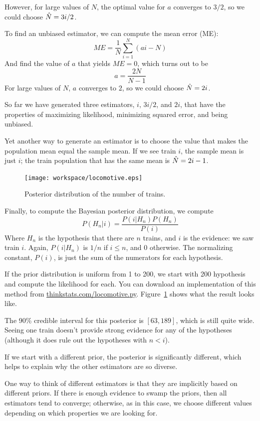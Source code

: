 \documentclass[12pt]{book}
\begin{document}
However, for large values of $N$, the optimal value for $a$ converges
to $3/2$, so we could choose $\hat{N} = 3i / 2$.

To find an unbiased estimator, we can compute the mean error (ME):
%
\[ ME = \frac{1}{N} \sum_{i=1}^N (ai - N) \]
%
And find the value of $a$ that yields $ME = 0$, which turns out to be
%
\[ a = \frac{2N}{N-1}\]
%
For large values of $N$, $a$ converges to $2$, so we could choose
$\hat{N} = 2i$.

So far we have generated three estimators, $i$, $3i/2$, and $2i$,
that have the properties of maximizing likelihood, minimizing squared
error, and being unbiased.

Yet another way to generate an estimator is to choose the value
that makes the population mean equal the sample mean.  If we see train
$i$, the sample mean is just $i$; the train population that has the
same mean is $\hat{N} = 2i - 1$.

\begin{figure}
\centerline{\texttt{[image: workspace/locomotive.eps]}}
\caption{Posterior distribution of the number of trains.}
\label{locomotive}
\end{figure}

Finally, to compute the Bayesian posterior distribution, we compute
%
\[ P(H_n|i) = \frac{P(i|H_n) P(H_n)}{P(i)} \]
%
Where $H_n$ is the hypothesis that there are $n$ trains, and $i$ is
the evidence: we saw train $i$.  Again, $P(i|H_n)$
is $1/n$ if $i \le n$, and 0 otherwise.  The normalizing constant,
$P(i)$, is just the sum of the numerators for each hypothesis.


If the prior distribution is uniform from 1 to 200, we start with 200
hypothesis and compute the likelihood for each.  You can download an
implementation of this method from
\url{thinkstats.com/locomotive.py}.  Figure~\ref{locomotive} shows
what the result looks like.

The 90\% credible interval for this posterior is $[63, 189]$, which
is still quite wide.  Seeing one train doesn't provide strong evidence
for any of the hypotheses (although it does rule out the hypotheses
with $n < i$).


If we start with a different prior, the posterior is significantly
different, which helps to explain why the other estimators are so
diverse.

One way to think of different estimators is that they are implicitly
based on different priors.  If there is enough evidence to swamp
the priors, then all estimators tend to converge; otherwise, as
in this case, we choose different values depending on which properties
we are looking for.
\end{document}
